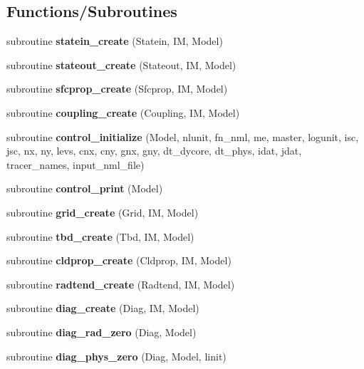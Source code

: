 \subsection*{Functions/\+Subroutines}
\begin{DoxyCompactItemize}
\item 
subroutine \textbf{ statein\+\_\+create} (Statein, IM, Model)
\item 
subroutine \textbf{ stateout\+\_\+create} (Stateout, IM, Model)
\item 
subroutine \textbf{ sfcprop\+\_\+create} (Sfcprop, IM, Model)
\item 
subroutine \textbf{ coupling\+\_\+create} (Coupling, IM, Model)
\item 
subroutine \textbf{ control\+\_\+initialize} (Model, nlunit, fn\+\_\+nml, me, master, logunit, isc, jsc, nx, ny, levs, cnx, cny, gnx, gny, dt\+\_\+dycore, dt\+\_\+phys, idat, jdat, tracer\+\_\+names, input\+\_\+nml\+\_\+file)
\item 
subroutine \textbf{ control\+\_\+print} (Model)
\item 
subroutine \textbf{ grid\+\_\+create} (Grid, IM, Model)
\item 
subroutine \textbf{ tbd\+\_\+create} (Tbd, IM, Model)
\item 
subroutine \textbf{ cldprop\+\_\+create} (Cldprop, IM, Model)
\item 
subroutine \textbf{ radtend\+\_\+create} (Radtend, IM, Model)
\item 
subroutine \textbf{ diag\+\_\+create} (Diag, IM, Model)
\item 
subroutine \textbf{ diag\+\_\+rad\+\_\+zero} (Diag, Model)
\item 
subroutine \textbf{ diag\+\_\+phys\+\_\+zero} (Diag, Model, linit)
\end{DoxyCompactItemize}
